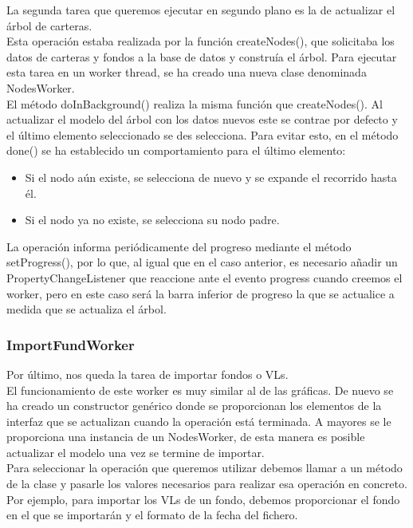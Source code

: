 \documentclass[12pt, a4paper]{book}
\begin{document}
La segunda tarea que queremos ejecutar en segundo plano es la de actualizar el árbol de carteras.\\

Esta operación estaba realizada por la función createNodes(), que solicitaba los datos de carteras y fondos a la base de datos y construía el árbol. Para ejecutar esta tarea en un worker thread, se ha creado una nueva clase denominada NodesWorker.\\

El método doInBackground() realiza la misma función que createNodes(). Al actualizar el modelo del árbol con los datos nuevos este se contrae por defecto y el último elemento seleccionado se des selecciona. Para evitar esto, en el método done() se ha establecido un comportamiento para el último elemento:

\begin{itemize}
	\item Si el nodo aún existe, se selecciona de nuevo y se expande el recorrido hasta él.
	\item Si el nodo ya no existe, se selecciona su nodo padre.
\end{itemize} 

La operación informa periódicamente del progreso mediante el método setProgress(), por lo que, al igual que en el caso anterior, es necesario añadir un PropertyChangeListener que reaccione ante el evento progress cuando creemos el worker, pero en este caso será la barra inferior de progreso la que se actualice a medida que se actualiza el árbol.

\subsubsection{ImportFundWorker}

Por último, nos queda la tarea de importar fondos o \gls{VL}s.\\

El funcionamiento de este worker es muy similar al de las gráficas. De nuevo se ha creado un constructor genérico donde se proporcionan los elementos de la interfaz que se actualizan cuando la operación está terminada. A mayores se le proporciona una instancia de un NodesWorker, de esta manera es posible actualizar el modelo una vez se termine de importar.\\

Para seleccionar la operación que queremos utilizar debemos llamar a un método de la clase y pasarle los valores necesarios para realizar esa operación en concreto. Por ejemplo, para importar los \gls{VL}s de un fondo, debemos proporcionar el fondo en el que se importarán y el formato de la fecha del fichero.\\
\end{document}
